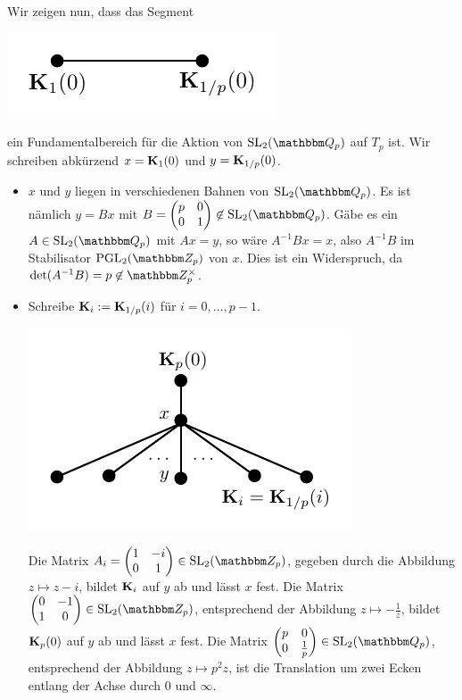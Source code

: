 \documentclass[a4paper, 12pt, twoside]{article}
\begin{document}
Wir zeigen nun, dass das Segment
\begin{center}
	\includegraphics{grugraImages/Kkante}
\end{center}
ein Fundamentalbereich für die Aktion von $\SL_2(\QQ_p)$ auf $T_p$
ist. Wir schreiben abkürzend $x=\mathbf{K}_1(0)$ und $y=\mathbf{K}_{1/p}(0)$.
\begin{itemize}
\item $x$ und $y$ liegen in verschiedenen Bahnen von $\SL_2(\QQ_p)$.
Es ist nämlich $y=Bx$ mit
$B=\begin{pmatrix} p&0\\ 0&1 \end{pmatrix}\not\in\SL_2(\QQ_p)$.
Gäbe es ein $A\in\SL_2(\QQ_p)$ mit $Ax=y$, so wäre
$A^{-1} B x = x$, also $A^{-1}B$ im Stabilisator $\PGL_2(\ZZ_p)$
von $x$. Dies ist ein Widerspruch, da
$\det(A^{-1}B)=p\not\in\ZZ_p^\times$.
\item Schreibe $\mathbf{K}_i:=\mathbf{K}_{1/p}(i)$ für $i=0,\ldots,p-1$.
\begin{center}
	\includegraphics{grugraImages/Ki}
\end{center}
Die Matrix
$A_i=\begin{pmatrix} 1&-i\\ 0&1\end{pmatrix}\in\SL_2(\ZZ_p)$,
gegeben durch die Abbildung
$z\mapsto z-i$, bildet $\mathbf{K}_i$ auf $y$ ab und lässt $x$ fest.
Die Matrix
$\begin{pmatrix} 0&-1\\ 1&0 \end{pmatrix}\in\SL_2(\ZZ_p)$,
entsprechend der Abbildung $z\mapsto -\frac{1}{z}$, bildet
$\mathbf{K}_p(0)$ auf $y$ ab und lässt $x$ fest.
Die Matrix
$\begin{pmatrix} p&0\\ 0&\frac{1}{p} \end{pmatrix}\in\SL_2(\QQ_p)$,
entsprechend der Abbildung $z\mapsto p^2z$, ist die Translation
um zwei Ecken entlang der Achse durch $0$ und $\infty$.
\end{itemize}
\end{document}

